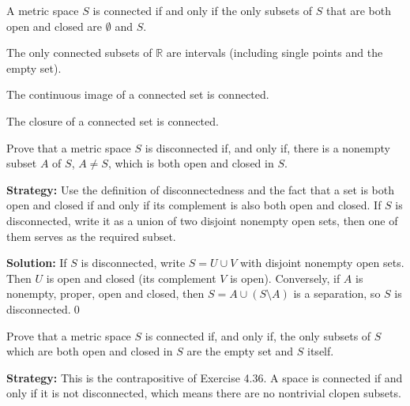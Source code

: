 \begin{theorem}
A metric space $S$ is connected if and only if the only subsets of $S$ that are both open and closed are $\emptyset$ and $S$.
\end{theorem}

\begin{theorem}
The only connected subsets of $\mathbb{R}$ are intervals (including single points and the empty set).
\end{theorem}

\begin{theorem}
The continuous image of a connected set is connected.
\end{theorem}

\begin{theorem}
The closure of a connected set is connected.
\end{theorem}



\begin{problembox}
Prove that a metric space $S$ is disconnected if, and only if, there is a nonempty subset $A$ of $S$, $A \neq S$, which is both open and closed in $S$.
\end{problembox}

\noindent\textbf{Strategy:} Use the definition of disconnectedness and the fact that a set is both open and closed if and only if its complement is also both open and closed. If $S$ is disconnected, write it as a union of two disjoint nonempty open sets, then one of them serves as the required subset.

\bigskip\noindent\textbf{Solution:}
If $S$ is disconnected, write $S=U\cup V$ with disjoint nonempty open sets. Then $U$ is open and closed (its complement $V$ is open). Conversely, if $A$ is nonempty, proper, open and closed, then $S=A\cup(S\setminus A)$ is a separation, so $S$ is disconnected.\qed



\begin{problembox}
Prove that a metric space $S$ is connected if, and only if, the only subsets of $S$ which are both open and closed in $S$ are the empty set and $S$ itself.
\end{problembox}

\noindent\textbf{Strategy:} This is the contrapositive of Exercise 4.36. A space is connected if and only if it is not disconnected, which means there are no nontrivial clopen subsets.

